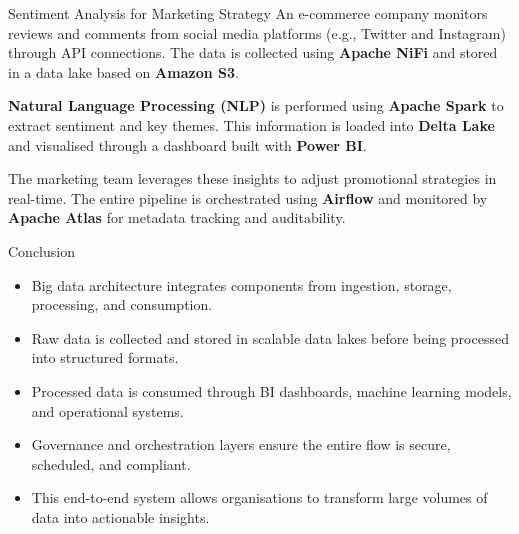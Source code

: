 \documentclass[aspectratio=169, table]{beamer}
\begin{document}
\begin{frame}[fragile]{Sentiment Analysis for Marketing Strategy}
	\vspace{10pt}
	An e-commerce company monitors reviews and comments from social media platforms (e.g., Twitter and Instagram) through API connections. The data is collected using \textbf{Apache NiFi} and stored in a data lake based on \textbf{Amazon S3}.
	
	\vspace{10pt}
	\textbf{Natural Language Processing (NLP)} is performed using \textbf{Apache Spark} to extract sentiment and key themes. This information is loaded into \textbf{Delta Lake} and visualised through a dashboard built with \textbf{Power BI}.
	
	\vspace{10pt}
	The marketing team leverages these insights to adjust promotional strategies in real-time. The entire pipeline is orchestrated using \textbf{Airflow} and monitored by \textbf{Apache Atlas} for metadata tracking and auditability.
\end{frame}

	
\begin{frame}[fragile]{Conclusion}
	\vspace{20pt}
	\begin{itemize}
		\item Big data architecture integrates components from ingestion, storage, processing, and consumption.
		\item Raw data is collected and stored in scalable data lakes before being processed into structured formats.
		\item Processed data is consumed through BI dashboards, machine learning models, and operational systems.
		\item Governance and orchestration layers ensure the entire flow is secure, scheduled, and compliant.
		\item This end-to-end system allows organisations to transform large volumes of data into actionable insights.
	\end{itemize}
\end{frame}

	
	
\end{document}

